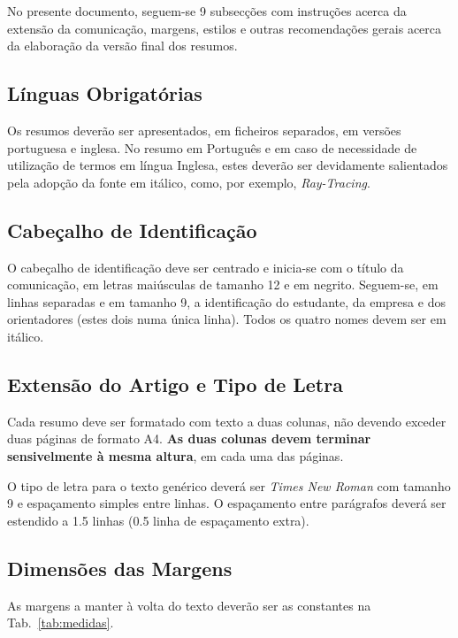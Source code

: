 \documentclass[9pt,a4paper]{extarticle}
\begin{document}
\begin{multicols}{2}
No presente documento, seguem-se 9 subsecções com instruções acerca da extensão da comunicação, margens, estilos e outras recomendações gerais acerca da elaboração da versão final dos resumos.

\subsection{Línguas Obrigatórias}\label{sec:lingua}

Os resumos deverão ser apresentados, em ficheiros separados, em versões portuguesa e inglesa. 
No resumo em Português e em caso de necessidade de utilização de termos em língua Inglesa, estes deverão ser devidamente salientados pela adopção da fonte em itálico, como, por exemplo, \emph{Ray-Tracing}.

\subsection{Cabeçalho de Identificação}

O cabeçalho de identificação deve ser centrado e inicia-se com o título da comunicação, em letras maiúsculas de tamanho 12 e em negrito. 
Seguem-se, em linhas separadas e em tamanho 9, a identificação do estudante, da empresa e dos orientadores (estes dois numa única linha). 
Todos os quatro nomes devem ser em itálico.

\subsection{Extensão do Artigo e Tipo de Letra}

Cada resumo deve ser formatado com texto a duas colunas, não devendo exceder duas páginas de formato A4. 
\textbf{As duas colunas devem terminar sensivelmente à mesma altura}, em cada uma das páginas. 

O tipo de letra para o texto genérico deverá ser \emph{Times New Roman} com tamanho 9 e espaçamento simples entre linhas. 
O espaçamento entre parágrafos deverá ser estendido a 1.5 linhas (0.5 linha de espaçamento extra).

\subsection{Dimensões das Margens}

As margens a manter à volta do texto deverão ser as constantes na Tab.~\ref{tab:medidas}.


\end{multicols}
\end{document}
